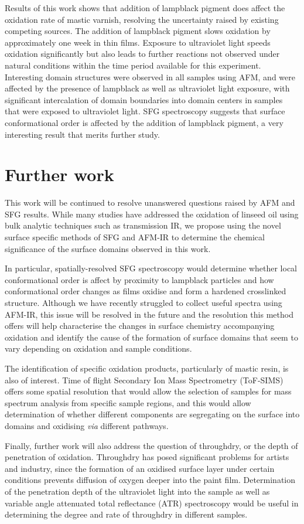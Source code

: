Results of this work shows that addition of lampblack pigment does affect the oxidation rate of mastic varnish, resolving the uncertainty raised by existing competing sources. The addition of lampblack pigment slows oxidation by approximately one week in thin films. Exposure to ultraviolet light speeds oxidation significantly but also leads to further reactions not observed under natural conditions within the time period available for this experiment. Interesting domain structures were observed in all samples using AFM, and were affected by the presence of lampblack as well as ultraviolet light exposure, with significant intercalation of domain boundaries into domain centers in samples that were exposed to ultraviolet light. SFG spectroscopy suggests that surface conformational order is affected by the addition of lampblack pigment, a very interesting result that merits further study.

\section{Further work}
\label{section4.2}

This work will be continued to resolve unanswered questions raised by AFM and SFG results. While many studies have addressed the oxidation of linseed oil using bulk analytic techniques such as transmission IR, we propose using the novel surface specific methods of SFG and AFM-IR to determine the chemical significance of the surface domains observed in this work. 

In particular, spatially-resolved SFG spectroscopy would determine whether local conformational order is affect by proximity to lampblack particles and how conformational order changes as films oxidise and form a hardened crosslinked structure. Although we have recently struggled to collect useful spectra using AFM-IR, this issue will be resolved in the future and the resolution this method offers will help characterise the changes in surface chemistry accompanying oxidation and identify the cause of the formation of surface domains that seem to vary depending on oxidation and sample conditions.

The identification of specific oxidation products, particularly of mastic resin, is also of interest. Time of flight Secondary Ion Mass Spectrometry (ToF-SIMS) offers some spatial resolution that would allow the selection of samples for mass spectrum analysis from specific sample regions, and this would allow determination of whether different components are segregating on the surface into domains and oxidising \textit{via} different pathways.  

Finally, further work will also address the question of throughdry, or the depth of penetration of oxidation. Throughdry has posed significant problems for artists and industry, since the formation of an oxidised surface layer under certain conditions prevents diffusion of oxygen deeper into the paint film. Determination of the penetration depth of the ultraviolet light into the sample as well as variable angle attenuated total reflectance (ATR) spectroscopy would be useful in determining the degree and rate of throughdry in different samples. 




